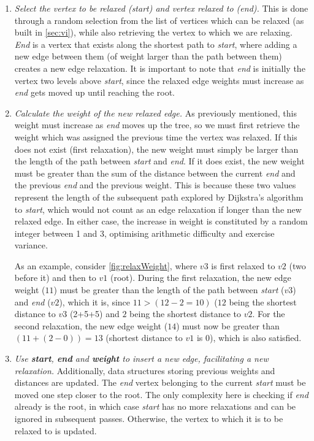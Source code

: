 \documentclass{l4proj}
\begin{document}
\begin{enumerate}[i]
	\item
	\emph{Select the vertex to be relaxed (start) and vertex relaxed to (end).} This is done through a random selection from the list of vertices which can be relaxed (as built in \autoref{sec:vi}), while also retrieving the vertex to which we are relaxing. \emph{End} is a vertex that exists along the shortest path to \emph{start}, where adding a new edge between them (of weight larger than the path between them) creates a new edge relaxation. It is important to note that \emph{end} is initially the vertex two levels above \emph{start}, since the relaxed edge weights must increase as \emph{end} gets moved up until reaching the root.

	\item
	\emph{Calculate the weight of the new relaxed edge.} As previously mentioned, this weight must increase as \emph{end} moves up the tree, so we must first retrieve the weight which was assigned the previous time the vertex was relaxed. If this does not exist (first relaxation), the new weight must simply be larger than the length of the path between \emph{start} and \emph{end}. If it does exist, the new weight must be greater than the sum of the distance between the current \emph{end} and the previous \emph{end} and the previous weight. This is because these two values represent the length of the subsequent path explored by Dijkstra's algorithm to \emph{start}, which would not count as an edge relaxation if longer than the new relaxed edge. In either case, the increase in weight is constituted by a random integer between 1 and 3, optimising arithmetic difficulty and exercise variance.

As an example, consider \autoref{fig:relaxWeight}, where $v3$ is first relaxed to $v2$ (two before it) and then to $v1$ (root). During the first relaxation, the new edge weight ($11$) must be greater than the length of the path between \emph{start} ($v3$) and \emph{end} ($v2$), which it is, since $11 > (12 - 2 = 10)$ ($12$ being the shortest distance to $v3$ (2+5+5) and $2$ being the shortest distance to $v2$. For the second relaxation, the new edge weight ($14$) must now be greater than $(11 + (2-0)) = 13$ (shortest distance to $v1$ is $0$), which is also satisfied.

\item
\emph{Use \textbf{start}, \textbf{end} and \textbf{weight} to insert a new edge, facilitating a new relaxation.} Additionally, data structures storing previous weights and distances are updated. The \emph{end} vertex belonging to the current \emph{start} must be moved one step closer to the root. The only complexity here is checking if \emph{end} already is the root, in which case \emph{start} has no more relaxations and can be ignored in subsequent passes. Otherwise, the vertex to which it is to be relaxed to is updated.
\end{enumerate}
\end{document}
